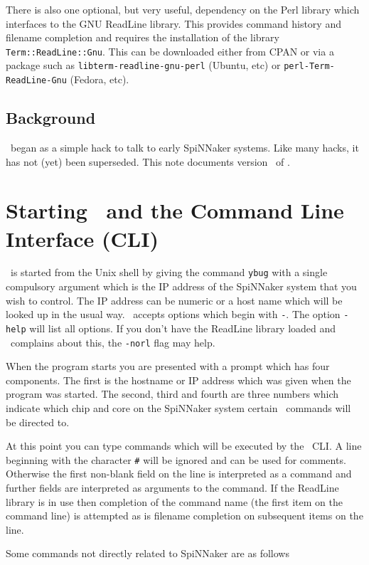There is also one optional, but very useful, dependency on the Perl
library which interfaces to the GNU ReadLine library. This provides
command history and filename completion and requires the installation
of the library \texttt{Term::ReadLine::Gnu}. This can be downloaded
either from CPAN or via a package such
as \texttt{libterm-readline-gnu-perl} (Ubuntu, etc)
or \texttt{perl-Term-ReadLine-Gnu} (Fedora, etc).

\subsection{Background}

\ybug\ began as a simple hack to talk to early SpiNNaker systems. Like
many hacks, it has not (yet) been superseded. This note documents
version \Version\ of \ybug.

\section{Starting \ybug\ and the Command Line Interface (CLI)}

\ybug\ is started from the Unix shell by giving the command \texttt{ybug}
with a single compulsory argument which is the IP address of the
SpiNNaker system that you wish to control. The IP address can be
numeric or a host name which will be looked up in the usual way. \ybug\
accepts options which begin with \texttt{-}. The option \texttt{-help}
will list all options. If you don't have the ReadLine library loaded
and \ybug\ complains about this, the \texttt{-norl} flag may help.

When the program starts you are presented with a prompt which has four
components. The first is the hostname or IP address which was given
when the program was started. The second, third and fourth are three
numbers which indicate which chip and core on the SpiNNaker system
certain \ybug\ commands will be directed to.

At this point you can type commands which will be executed by
the \ybug\ CLI. A line beginning with the character \texttt{\#} will
be ignored and can be used for comments. Otherwise the first non-blank
field on the line is interpreted as a command and further fields are
interpreted as arguments to the command. If the ReadLine library is in
use then completion of the command name (the first item on the command
line) is attempted as is filename completion on subsequent items on the
line.

Some commands not directly related to SpiNNaker are as follows

